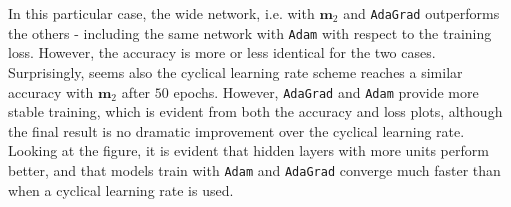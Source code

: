\documentclass{article}
\begin{document}
	In this particular case, the wide network, i.e. with $\bm{m}_2$ and \texttt{AdaGrad} outperforms the others - including the same network with \texttt{Adam} with respect to the training loss. However, the accuracy is more or less identical for the two cases. Surprisingly, seems also the cyclical learning rate scheme reaches a similar accuracy with $\bm{m}_2$ after $50$ epochs. However, \texttt{AdaGrad} and \texttt{Adam} provide more stable training, which is evident from both the accuracy and loss plots, although the final result is no dramatic improvement over the cyclical learning rate. Looking at the figure, it is evident that hidden layers with more units perform better, and that models train with \texttt{Adam} and \texttt{AdaGrad} converge much faster than when a cyclical learning rate is used. 
\end{document}
